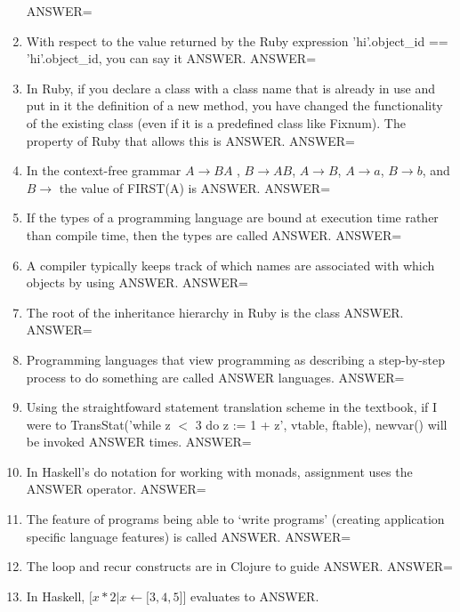\documentclass{exam}
\begin{document}
\begin{enumerate}
ANSWER=
\item With respect to the value returned by the Ruby expression 'hi'.object\_id == 'hi'.object\_id, you can say it ANSWER.\newline
ANSWER=
\item In Ruby, if you declare a class with a class name that is already in use and put in it the definition of a new method, you have changed the functionality of the existing class (even if it is a predefined class like Fixnum).  The property of Ruby that allows this is ANSWER.\newline
ANSWER=
\item In the context-free grammar $A \rightarrow B A$ , $B \rightarrow A B$, $A \rightarrow B$, $A \rightarrow a$, $B \rightarrow b$, and $B \rightarrow$  the value of FIRST(A) is ANSWER.\newline
ANSWER=
\item If the types of a programming language are bound at execution time rather than compile time, then the types are called ANSWER.\newline
ANSWER=
\item A compiler typically keeps track of which names are associated with which objects by using ANSWER.\newline
ANSWER=
\item The root of the inheritance hierarchy in Ruby is the class ANSWER.\newline
ANSWER=
\item Programming languages that view programming as describing a step-by-step process to do something are called ANSWER languages.\newline
ANSWER=
\item Using the straightfoward statement translation scheme in the textbook, if I were to TransStat('while z $<$ 3 do z := 1 + z', vtable, ftable), newvar() will be invoked ANSWER times.\newline
ANSWER=
\item In Haskell's do notation for working with monads, assignment uses the ANSWER operator.\newline
ANSWER=
\item The feature of programs being able to `write programs' (creating application specific language features) is called ANSWER.\newline
ANSWER=
\item The loop and recur constructs are in Clojure to guide ANSWER.\newline
ANSWER=
\item In Haskell, $\lbrack x * 2 | x \leftarrow \lbrack 3, 4, 5\rbrack \rbrack$  evaluates to ANSWER.\newline

\end{enumerate}
\end{document}

